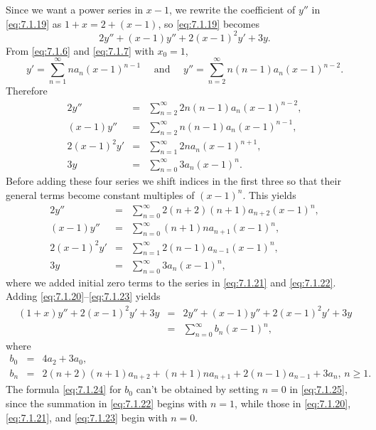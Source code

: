\begin{examplesolution}
\solution Since we want a power series in $x-1$, we rewrite the coefficient of $y''$ in
\eqref{eq:7.1.19} as $1+x=2+(x-1)$, so \eqref{eq:7.1.19} becomes
\[
  2y''+(x-1)y''+2(x-1)^{2}y'+3y.
\]
From \eqref{eq:7.1.6} and \eqref{eq:7.1.7} with $x_{0}=1$,
\[
  y'=\sum_{n=1}^{\infty}na_{n}(x-1)^{n-1}\quad\mbox{ and }\quad y''=\sum_{n=2}^{\infty}n(n-1)a_{n}(x-1)^{n-2}.
\]
Therefore
\begin{eqnarray*}
  2y''         & = & \sum_{n=2}^{\infty}2n(n-1)a_{n}(x-1)^{n-2}, \\
  (x-1)y''     & = & \sum_{n=2}^{\infty}n(n-1)a_{n}(x-1)^{n-1},  \\
  2(x-1)^{2}y' & = & \sum_{n=1}^{\infty}2na_{n}(x-1)^{n+1},      \\
  3y           & = & \sum_{n=0}^{\infty}3a_{n}(x-1)^{n}.
\end{eqnarray*}
Before adding these four series we shift indices in the first three so that their general terms
become constant multiples of $(x-1)^{n}$. This yields
\begin{eqnarray}
  2y ''&=&\sum_{n=0}^\infty 2(n+2)(n+1)a_{n+2}(x-1)^n,\label{eq:7.1.20}\\ (x-1)y''&=&\sum_{n=0}^\infty (n+1)na_{n+1}(x-1)^n, \label{eq:7.1.21}\\ 2(x-1)^2y'&=&\sum_{n=1}^\infty 2(n-1)a_{n-1}(x-1)^n,\label{eq:7.1.22}\\
  3y&=&\sum_{n=0}^\infty 3a_n (x-1)^n, \label{eq:7.1.23}
\end{eqnarray}
where we added initial zero terms to the series in \eqref{eq:7.1.21} and \eqref{eq:7.1.22}. Adding
\eqref{eq:7.1.20}--\eqref{eq:7.1.23} yields
\begin{eqnarray*}
  (1+x)y''+2(x-1)^{2}y'+3y & = & 2y''+(x-1)y''+2(x-1)^{2}y'+3y \\[5pt]
                           & = & \sum_{n=0}^{\infty}b_{n}(x-1)^{n},
\end{eqnarray*}
where
\begin{eqnarray}
  b_{0} & = & 4a_{2}+3a_{0},\label{eq:7.1.24} \\
  b_{n} & = & 2(n+2)(n+1)a_{n+2}+(n+1)na_{n+1}+2(n-1)a_{n-1}+3a_{n},\,n\ge1\label{eq:7.1.25}.
\end{eqnarray}
The formula \eqref{eq:7.1.24} for $b_{0}$ can't be obtained by setting $n=0$ in \eqref{eq:7.1.25},
since the summation in \eqref{eq:7.1.22} begins with $n=1$, while those in \eqref{eq:7.1.20},
\eqref{eq:7.1.21}, and \eqref{eq:7.1.23} begin with $n=0$.
\end{examplesolution}

